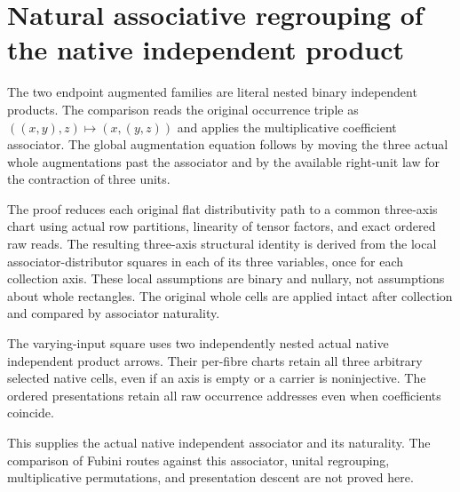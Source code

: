 \documentclass{article}
\begin{document}
\section*{Natural associative regrouping of the native independent product}
The two endpoint augmented families are literal nested binary
independent products. The comparison reads the original occurrence
triple as $((x,y),z)\mapsto(x,(y,z))$ and applies the multiplicative
coefficient associator. The global augmentation equation follows by
moving the three actual whole augmentations past the associator and
by the available right-unit law for the contraction of three units.

The proof reduces each original flat distributivity path to a common
three-axis chart using actual row partitions, linearity of tensor
factors, and exact ordered raw reads. The resulting three-axis
structural identity is derived from the local associator-distributor
squares in each of its three variables, once for each collection axis.
These local assumptions are binary and nullary, not assumptions about
whole rectangles. The original whole cells are applied intact after
collection and compared by associator naturality.

The varying-input square uses two independently nested actual native
independent product arrows. Their per-fibre charts retain all three
arbitrary selected native cells, even if an axis is empty or a carrier
is noninjective. The ordered presentations retain all raw occurrence
addresses even when coefficients coincide.

This supplies the actual native independent associator and its
naturality. The comparison of Fubini routes against this associator,
unital regrouping, multiplicative permutations, and presentation
descent are not proved here.
\end{document}
